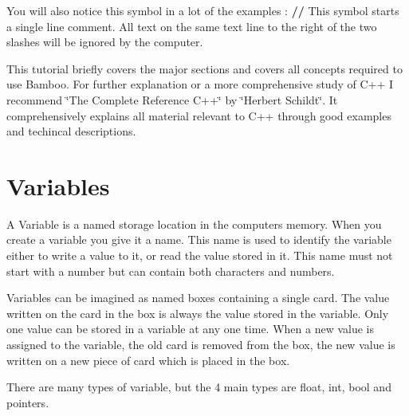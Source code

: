  You will also notice this symbol in a lot of the examples : {\bfseries //} This symbol starts a single line comment. All text on the same text line to the right of the two slashes will be ignored by the computer. \par
 \par
 This tutorial briefly covers the major sections and covers all concepts required to use Bamboo. For further explanation or a more comprehensive study of C++ I recommend \char`\"{}The Complete Reference C++\char`\"{} by \char`\"{}Herbert Schildt\char`\"{}. It comprehensively explains all material relevant to C++ through good examples and techincal descriptions. \hypertarget{_programming_basics_BasicsPageVariables}{}\section{Variables}\label{_programming_basics_BasicsPageVariables}
A Variable is a named storage location in the computers memory. When you create a variable you give it a name. This name is used to identify the variable either to write a value to it, or read the value stored in it. This name must not start with a number but can contain both characters and numbers. \par
 \par
 Variables can be imagined as named boxes containing a single card. The value written on the card in the box is always the value stored in the variable. Only one value can be stored in a variable at any one time. When a new value is assigned to the variable, the old card is removed from the box, the new value is written on a new piece of card which is placed in the box. \par
 There are many types of variable, but the 4 main types are float, int, bool and pointers.
